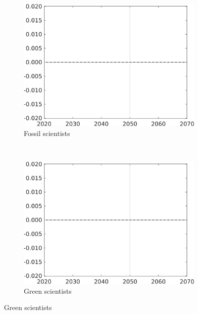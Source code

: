\begin{figure}[h!!!]
	\begin{subfigure}{0.4\textwidth}
		\caption{Fossil scientists}
		\includegraphics[width=1\textwidth]{../../codding_model/own_basedOnFried/optimalPol_010922_revision/figures/all_13Sept22_Tplus30/CountTAUFPerDif_Opt_target_sff_nsk1_xgr0_knspil0_regime4_spillover0_sep0_extern0_PV1_etaa0.79.png}
	\end{subfigure}
\begin{minipage}[]{0.1\textwidth}
\
\end{minipage}
	\begin{subfigure}{0.4\textwidth}
		\caption{Green scientists}
		\includegraphics[width=1\textwidth]{../../codding_model/own_basedOnFried/optimalPol_010922_revision/figures/all_13Sept22_Tplus30/CountTAUFPerDif_Opt_target_sg_nsk1_xgr0_knspil0_regime4_spillover0_sep0_extern0_PV1_etaa0.79.png}
	\end{subfigure}


\end{figure}
